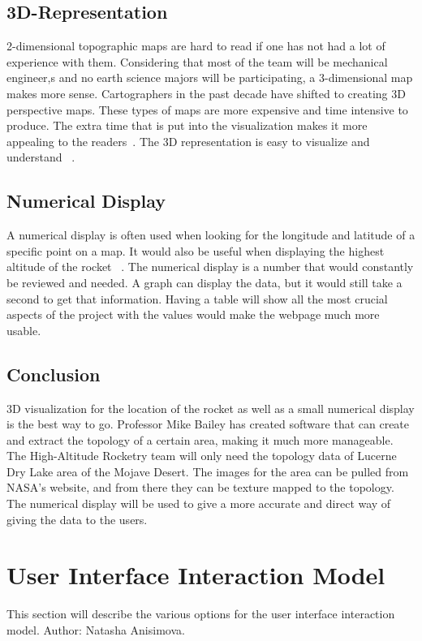 \documentclass[10pt,draftclsnofoot,onecolumn]{IEEEtran}
\begin{document}
	\subsection{3D-Representation}
	2-dimensional topographic maps are hard to read if one has not had a lot of experience with them. 
	Considering that most of the team will be mechanical engineer,s and no earth science majors will be participating, a 
	3-dimensional map makes more sense. 
	Cartographers in the past decade have shifted to creating 3D perspective maps. 
	These types of maps are more expensive and time intensive to produce. 
	The extra time that is put into the visualization makes it more appealing to the readers~\cite{evaluating-the-effectiveness-of-2d-vs-3d-trailhead-maps}. 
	The 3D representation is easy to visualize and understand ~\cite{3d-represenation-for-software-visualization}.
	
	\subsection{Numerical Display}
	A numerical display is often used when looking for the longitude and latitude of a specific point on a map. 
	It would also be useful when displaying the highest altitude of the rocket ~\cite{data-display}. 
	The numerical display is a number that would constantly be reviewed and needed. 
	A graph can display the data, but it would still take a second to get that information. 
	Having a table will show all the most crucial aspects of the project with the values would make the webpage much more usable.
	
	\subsection{Conclusion}
	3D visualization for the location of the rocket as well as a small numerical display is the best way to go. 
	Professor Mike Bailey has created software that can create and extract the topology of a certain area, 
	making it much more manageable. 
	The High-Altitude Rocketry team will only need the topology data of Lucerne Dry Lake area of the Mojave Desert. 
	The images for the area can be pulled from NASA's website, and from there they can be texture mapped to the topology. 
	The numerical display will be used to give a more accurate and direct way of giving the data to the users. 
	
	\section{User Interface Interaction Model}
	This section will describe the various options for the user interface interaction model. Author: Natasha Anisimova.
	
\end{document}
